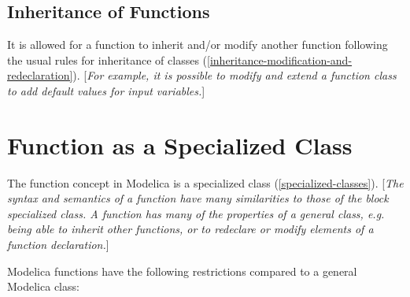 \documentclass[10pt,a4paper]{report}
\def\doublelabel#1{\label{#1}\hypertarget{#1}{}}
\begin{document}
\subsection{Inheritance of Functions}\doublelabel{inheritance-of-functions}

It is allowed for a function to inherit and/or modify another function
following the usual rules for inheritance of classes (\ref{inheritance-modification-and-redeclaration}).
{[}\emph{For example, it is possible to modify and extend a function
class to add default values for input variables.}{]}

\section{Function as a Specialized Class}\doublelabel{function-as-a-specialized-class}

The function concept in Modelica is a specialized class (\ref{specialized-classes}).
{[}\emph{The syntax and semantics of a function have many similarities
to those of the block specialized class. A function has many of the
properties of a general class, e.g. being able to inherit other
functions, or to redeclare or modify elements of a function
declaration.}{]}

Modelica functions have the following restrictions compared to a general
Modelica class:
\end{document}
